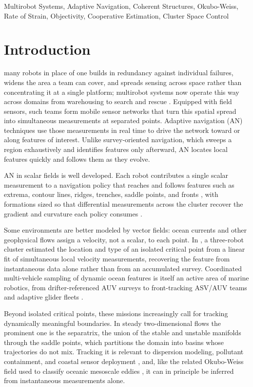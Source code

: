 \documentclass[lettersize,journal]{IEEEtran}
\begin{document}
\begin{IEEEkeywords}
Multirobot Systems, Adaptive Navigation, Coherent Structures,
Okubo-Weiss, Rate of Strain, Objectivity, Cooperative
Estimation, Cluster Space Control
\end{IEEEkeywords}

\section{Introduction}
\label{sec:intro}

 many robots in place of one builds in
redundancy against individual failures, widens the area a team can
cover, and spreads sensing across space rather than concentrating it at
a single platform; multirobot systems now operate this way across
domains from warehousing to search and rescue \cite{1}. Equipped with
field sensors, such teams form mobile sensor networks that turn this
spatial spread into simultaneous measurements at separated points.
Adaptive navigation (AN) techniques use those measurements in real time
to drive the network toward or along features of interest. Unlike
survey-oriented navigation, which sweeps a region exhaustively and
identifies features only afterward, AN locates local features quickly
and follows them as they evolve.

AN in scalar fields is well developed. Each robot contributes a single
scalar measurement to a navigation policy that reaches and follows
features such as extrema, contour lines, ridges, trenches, saddle
points, and fronts \cite{26,27,28,29}, with formations sized so that
differential measurements across the cluster recover the gradient and
curvature each policy consumes \cite{15,26}.

Some environments are better modeled by vector fields: ocean currents
and other geophysical flows assign a velocity, not a scalar, to each
point. In \cite{14}, a three-robot cluster estimated the location and
type of an isolated critical point from a linear fit of simultaneous
local velocity measurements, recovering the feature from instantaneous
data alone rather than from an accumulated survey. Coordinated
multi-vehicle sampling of dynamic ocean features is itself an active
area of marine robotics, from drifter-referenced AUV surveys \cite{2} to
front-tracking ASV/AUV teams \cite{3} and adaptive glider fleets
\cite{4}.

Beyond isolated critical points, these missions increasingly call for
tracking dynamically meaningful boundaries. In steady two-dimensional
flows the prominent one is the separatrix, the union of the stable and
unstable manifolds through the saddle points, which partitions the
domain into basins whose trajectories do not mix. Tracking it is
relevant to dispersion modeling, pollutant containment, and coastal
sensor deployment \cite{6,7,8}, and, like the related Okubo-Weiss field
used to classify oceanic mesoscale eddies \cite{5}, it can in principle
be inferred from instantaneous measurements alone.
\end{document}
